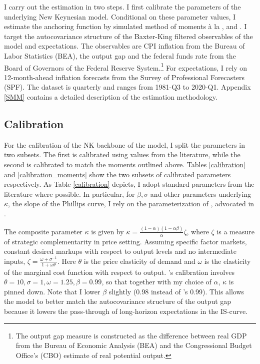 \documentclass[11pt]{article}
\renewcommand{\[}{\begin{equation}}
\renewcommand{\]}{\end{equation}}
\begin{document}
I carry out the estimation in two steps. I first calibrate the parameters of the underlying New Keynesian model. Conditional on these parameter values, I estimate the anchoring function by simulated method of moments \`a la \cite{lee1991simulation}, \cite{duffie1990simulated} and \cite{smith1993SMM}. I target the autocovariance structure of the Baxter-King filtered observables of the model and expectations. The observables are CPI inflation from the Bureau of Labor Statistics (BEA), the output gap and the federal funds rate from the Board of Governors of the Federal Reserve System.\footnote{The output gap measure is constructed as the difference between real GDP from the Bureau of Economic Analysis (BEA) and the Congressional Budget Office's (CBO) estimate of real potential output.} For expectations, I rely on 12-month-ahead inflation forecasts from the Survey of Professional Forecasters (SPF). The dataset is quarterly and ranges from 1981-Q3 to 2020-Q1. Appendix \ref{SMM} contains a detailed description of the estimation methodology.



\subsection{Calibration}
For the calibration of the NK backbone of the model, I split the parameters in two subsets. The first is calibrated using values from the literature, while the second is calibrated to match the moments outlined above. Tables \ref{calibration} and \ref{calibration_moments} show the two subsets of calibrated parameters respectively. As Table \ref{calibration} depicts, I adopt standard parameters from the literature where possible. In particular, for $\beta, \sigma$ and other parameters underlying $\kappa$, the slope of the Phillips curve, I rely on the parameterization of \cite{chari2000sticky}, advocated in \cite{woodford2011interest}.

The composite parameter $\kappa$ is given by  $\kappa = \frac{(1-\alpha)(1-\alpha\beta)}{\alpha} \zeta$, where $\zeta$ is a measure of strategic complementarity in price setting. Assuming specific factor markets, constant desired markups with respect to output levels and no intermediate inputs, $\zeta = \frac{\omega + \sigma^{-1}}{1+\omega\theta}$. Here $\theta$ is the price elasticity of demand and $\omega$ is the elasticity of the marginal cost function with respect to output. \cite{chari2000sticky}'s calibration involves  $\theta =10, \sigma =1, \omega = 1.25, \beta = 0.99$, so that together with my choice of $\alpha$, $\kappa$ is pinned down. Note that I lower $\beta$ slightly (0.98 instead of \cite{chari2000sticky}'s 0.99). This allows the model to better match the autocovariance structure of the output gap because it lowers the pass-through of long-horizon expectations in the IS-curve.
\end{document}
